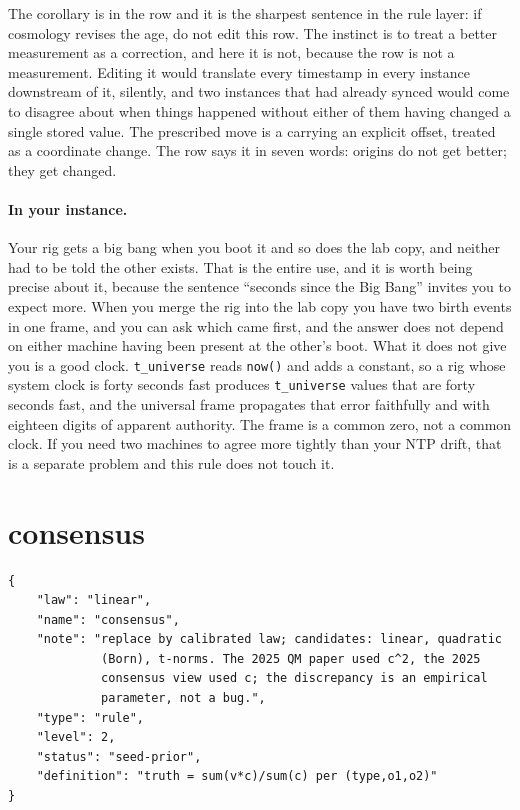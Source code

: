 The corollary is in the row and it is the sharpest sentence in the rule layer: if cosmology revises the age, do not edit this row. The instinct is to treat a better measurement as a correction, and here it is not, because the row is not a measurement. Editing it would translate every timestamp in every instance downstream of it, silently, and two instances that had already synced would come to disagree about when things happened without either of them having changed a single stored value. The prescribed move is a  carrying an explicit offset, treated as a coordinate change. The row says it in seven words: origins do not get better; they get changed.

\paragraph{In your instance.} Your rig gets a big bang when you boot it and so does the lab copy, and neither had to be told the other exists. That is the entire use, and it is worth being precise about it, because the sentence ``seconds since the Big Bang'' invites you to expect more. When you merge the rig into the lab copy you have two birth events in one frame, and you can ask which came first, and the answer does not depend on either machine having been present at the other's boot. What it does not give you is a good clock. \texttt{t\_universe} reads \texttt{now()} and adds a constant, so a rig whose system clock is forty seconds fast produces \texttt{t\_universe} values that are forty seconds fast, and the universal frame propagates that error faithfully and with eighteen digits of apparent authority. The frame is a common zero, not a common clock. If you need two machines to agree more tightly than your NTP drift, that is a separate problem and this rule does not touch it.

\section{consensus}

\begin{lstlisting}[language={},basicstyle=\ttfamily\footnotesize]
{
    "law": "linear",
    "name": "consensus",
    "note": "replace by calibrated law; candidates: linear, quadratic
             (Born), t-norms. The 2025 QM paper used c^2, the 2025
             consensus view used c; the discrepancy is an empirical
             parameter, not a bug.",
    "type": "rule",
    "level": 2,
    "status": "seed-prior",
    "definition": "truth = sum(v*c)/sum(c) per (type,o1,o2)"
}
\end{lstlisting}

